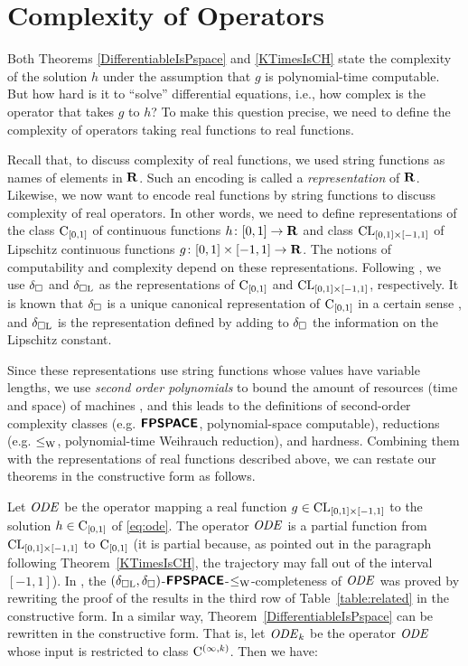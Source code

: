 \section{Complexity of Operators}
\label{section: constructive}

Both Theorems \ref{DifferentiableIsPspace} and \ref{KTimesIsCH}
state the complexity of the solution $h$ under the assumption 
that $g$ is polynomial-time computable.
But how hard is it to ``solve'' differential equations,
i.e., how complex is the operator that takes $g$ to $h$? 
To make this question precise,
we need to define the complexity of operators 
taking real functions to real functions.

Recall that, to discuss complexity of real functions,
we used string functions as names of elements in $\mathbf R$. 
Such an encoding is called a \emph{representation} of $\mathbf R$.
Likewise, 
we now want to encode real functions by string functions
to discuss complexity of real operators. 
In other words, we need to define representations of
the class $\mathrm C _{[0, 1]}$ of continuous functions $h \colon [0,1] \to \mathbf R$ 
and class $\mathrm{CL} _{[0, 1] \times [-1, 1]}$ of Lipschitz continuous functions $g \colon [0, 1] \times [-1, 1] \to \mathbf R$. 
The notions of computability and complexity depend on these representations.
Following \cite{kawamura2010operators},
we use $\delta _\square$ and $\delta _{\square \mathrm L}$ as the 
representations of $\mathrm C_{[0,1]}$ and $\mathrm{CL}_{[0, 1] \times [-1, 1]}$, 
respectively.
It is known that 
$\delta _\square$ is a unique canonical representation of $\mathrm C_{[0, 1]}$ 
in a certain sense \cite{kawamura11:_funct_space_repres_and_polyn_time_comput}, 
and $\delta _{\square \mathrm L}$ is the representation defined by adding to $\delta _\square$
the information on the Lipschitz constant.

Since these representations use string functions 
whose values have variable lengths,
we use \emph{second order polynomials}
to bound the amount of resources (time and space) of machines
\cite{kawamura2010operators}, 
and this leads to the definitions of second-order complexity classes
(e.g. $\text{\bfseries \sffamily \upshape FPSPACE}$, polynomial-space computable),
reductions (e.g. $\leq _{\mathrm W}$, polynomial-time Weihrauch reduction), 
and hardness.
Combining them with the representations of real functions described above,
we can restate our theorems in the constructive form as follows.

Let $\mathit{ODE}$ be the operator 
mapping a real function $g \in \mathrm{CL}_{[0, 1] \times [-1, 1]}$ to
the solution $h \in \mathrm C_{[0, 1]}$ of \eqref{eq:ode}.
The operator $\mathit{ODE}$ is a partial function 
from $\mathrm{CL} _{[0, 1] \times [-1, 1]}$ to $\mathrm C _{[0, 1]}$
(it is partial because, 
as pointed out in the paragraph following Theorem~\ref{KTimesIsCH}, 
the trajectory may fall out of the interval $[-1, 1]$).
In \cite[Theorem 4.9]{kawamura2010operators}, the
$(\delta _{\square \mathrm L}, \delta _\square)$-$\text{\bfseries \sffamily \upshape FPSPACE}$-$\leq _{\mathrm W}$-completeness of $\mathit{ODE}$ 
was proved
by rewriting 
the proof of the results in the third row of Table~\ref{table:related} in the constructive form.
In a similar way, Theorem~\ref{DifferentiableIsPspace} can be rewritten in the constructive form.
That is, let $\mathit{ODE} _k$ be the operator $\mathit{ODE}$ whose input is restricted to class $\mathrm C^{(\infty, k)}$. Then we have: 

